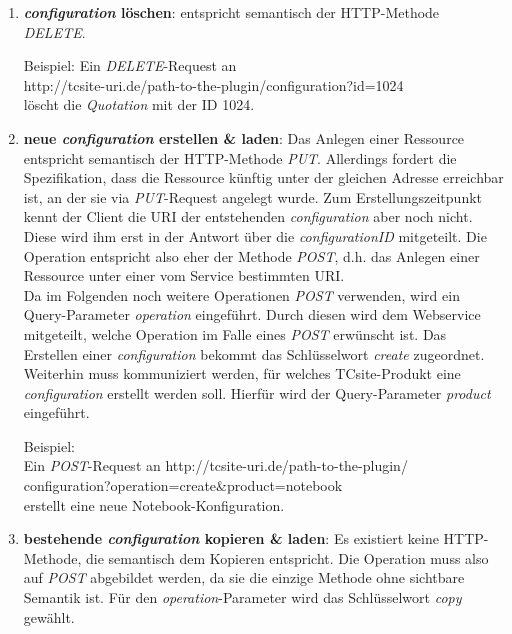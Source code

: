 \documentclass[11pt, a4paper, titlepage, listof=totoc, bibliography=totoc, index=totoc, twoside, openright, headings=normal]{scrreprt}
\begin{document}
\begin{enumerate}
\item \textbf{\emph{configuration} löschen}: entspricht semantisch der HTTP-Methode \emph{DELETE}. 
\begin{addmargin}[25pt]{0pt} 
Beispiel: Ein \emph{DELETE}-Request an\\
\glqq http://tcsite-uri.de/path-to-the-plugin/configuration?id=1024\grqq{}
\\löscht die \emph{Quotation} mit der ID 1024.
\end{addmargin}
\item \textbf{neue \emph{configuration} erstellen \& laden}: Das Anlegen einer Ressource entspricht semantisch der HTTP-Methode \emph{PUT}. Allerdings fordert die Spezifikation, dass die Ressource künftig unter der gleichen Adresse erreichbar ist, an der sie via \emph{PUT}-Request angelegt wurde. Zum Erstellungszeitpunkt kennt der Client die URI der entstehenden \emph{configuration} aber noch nicht. Diese wird ihm erst in der Antwort über die \emph{configurationID} mitgeteilt. Die Operation entspricht also eher der Methode \emph{POST}, d.h. das Anlegen einer Ressource unter einer vom Service bestimmten URI.\\Da im Folgenden noch weitere Operationen \emph{POST} verwenden, wird ein Query-Parameter \emph{operation} eingeführt. Durch diesen wird dem Webservice mitgeteilt, welche Operation im Falle eines \emph{POST} erwünscht ist. Das Erstellen einer \emph{configuration} bekommt das Schlüsselwort \emph{create} zugeordnet. Weiterhin muss kommuniziert werden, für welches TCsite-Produkt eine \emph{configuration} erstellt werden soll. Hierfür wird der Query-Parameter \emph{product} eingeführt.
\begin{addmargin}[25pt]{0pt} 
Beispiel:
\\Ein \emph{POST}-Request an \glqq http://tcsite-uri.de/path-to-the-plugin/
\\configuration?operation=create\&product=notebook\grqq{}\\
erstellt eine neue Notebook-Konfiguration.
\end{addmargin}
\item \textbf{bestehende \emph{configuration} kopieren \& laden}: Es existiert keine HTTP-Methode, die semantisch dem Kopieren entspricht. Die Operation muss also auf \emph{POST} abgebildet werden, da sie die einzige Methode ohne sichtbare Semantik ist. Für den \emph{operation}-Parameter wird das Schlüsselwort \emph{copy} gewählt.
\begin{addmargin}[25pt]{0pt} 

\end{addmargin}
\end{enumerate}
\end{document}
